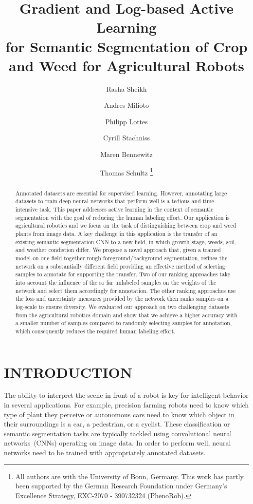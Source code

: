 \documentclass[letterpaper, 10 pt, conference]{ieeeconf}  %
\title{\LARGE \bf Gradient and Log-based Active Learning\\ for Semantic Segmentation of Crop and Weed for Agricultural Robots}
\author{Rasha Sheikh \and Andres Milioto \and Philipp Lottes \and Cyrill Stachniss \and Maren Bennewitz \and Thomas Schultz%
  \thanks{All authors are with the University of
    Bonn, Germany. This work has partly been supported by the German Research Foundation under Germany's Excellence Strategy, EXC-2070 - 390732324 (PhenoRob).}%
}
\begin{document}
\maketitle
\thispagestyle{empty} 
\pagestyle{empty}


\begin{abstract}
Annotated datasets are essential for supervised learning. However, annotating
large datasets to  train deep neural networks that perform well is a tedious
and time-intensive task. This paper  addresses active learning in the context
of semantic segmentation with the goal of reducing the  human labeling effort.
Our application is agricultural robotics  and we focus on the task of
distinguishing between crop and weed plants from image data. A key challenge in this
application is the  transfer of an existing semantic segmentation CNN to a new
field, in which growth stage, weeds, soil, and weather condistion differ. 
We propose a novel approach that, given a trained model on one field together
 rough foreground/background segmentation,
refines the network on a substantially different field  providing an effective
method of selecting samples to annotate for supporting the transfer. Two of our ranking approaches take
 into account the influence of the so far unlabeled samples on the
weights of the network and select them accordingly for annotation. The other ranking approaches 
use the loss and uncertainty measures provided by the network then ranks samples on a log-scale to ensure diversity.
We evaluated our approach on two challenging  datasets from the agricultural
robotics domain and show that we achieve a higher accuracy with a  smaller
number of samples compared to randomly selecting samples for annotation, which consequently reduces the required human labeling  effort.

\end{abstract} 

\section{INTRODUCTION}
\label{sec:intro}

The ability to  interpret the scene in front of a robot is key for
intelligent behavior in several applications. For example, precision farming
robots need to know which type of plant they perceive or autonomous cars need to
know  which object in their surroundings is a car, a pedestrian, or a
cyclist. These  classification or semantic segmentation tasks are typically
tackled using  convolutional neural networks~(CNNs) operating on  image data.
In order to perform  well, neural networks need to be trained with
appropriately annotated datasets.
\end{document}

